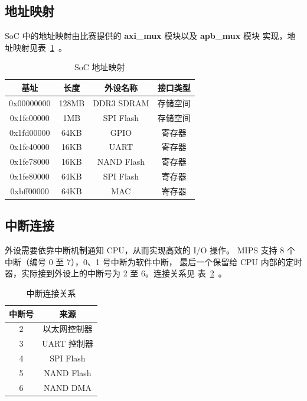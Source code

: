 \documentclass[blue,normal,cn,hide]{elegantbook}
\begin{document}
\subsection{地址映射}

SoC 中的地址映射由比赛提供的 \textbf{axi\_mux} 模块以及 \textbf{apb\_mux} 模块
实现，地址映射见表~\ref{tab:SoCAddressMapping}~。

\begin{table}
    \renewcommand\arraystretch{1.25}
    \centering
    \begin{tabular}{cccc}
        \toprule 
        \rowcolor{black!20} \textbf{基址} & \textbf{长度} & \textbf{外设名称} & \textbf{接口类型} \\
        \midrule
        0x00000000 & 128MB & DDR3 SDRAM & 存储空间  \\
        0x1fc00000 & 1MB & SPI Flash &  存储空间    \\
        0x1fd00000 & 64KB & GPIO &  寄存器          \\
        0x1fe40000 & 16KB & UART &  寄存器          \\
        0x1fe78000 & 16KB & NAND Flash &  寄存器    \\
        0x1fe80000 & 64KB & SPI Flash & 寄存器      \\
        0xbff00000 & 64KB & MAC & 寄存器            \\
        \bottomrule
    \end{tabular}
    \caption{SoC 地址映射}
    \label{tab:SoCAddressMapping}
\end{table}

\subsection{中断连接}

外设需要依靠中断机制通知 CPU，从而实现高效的 I/O 操作。
MIPS 支持 8 个中断（编号 0 至 7），0、1 号中断为软件中断，
最后一个保留给 CPU 内部的定时器，实际接到外设上的中断号为 2 至 6。连接关系见
表~\ref{tab:SoCInt}~。

\begin{table}
    \renewcommand\arraystretch{1.25}
    \centering
    \begin{tabular}{cc}
        \toprule 
        \rowcolor{black!20} \textbf{中断号} & \textbf{来源} \\
        \midrule
        2 & 以太网控制器 \\
        3 & UART 控制器 \\
        4 & SPI Flash  \\
        5 & NAND Flash \\
        6 & NAND DMA   \\
        \bottomrule
    \end{tabular}
    \caption{中断连接关系}
    \label{tab:SoCInt}
\end{table}
\end{document}
